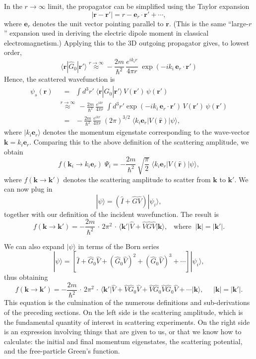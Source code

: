 \documentclass[pra,12pt]{revtex4}
\begin{document}
In the $r\rightarrow\infty$ limit, the propagator can be simplified
using the Taylor expansion
$$|\mathbf{r} - \mathbf{r}'| = r - \mathbf{e}_r \cdot \mathbf{r}' + \cdots,$$
where $\mathbf{e}_r$ denotes the unit vector pointing parallel to
$\mathbf{r}$.  (This is the same ``large-$r$'' expansion used in
deriving the electric dipole moment in classical electromagnetism.)
Applying this to the 3D outgoing propagator gives, to lowest order,
$$\langle\mathbf{r}|\hat{G}_0|\mathbf{r}'\rangle \overset{r\rightarrow\infty}{\approx} - \frac{2m}{\hbar^2}\, \frac{e^{ik_ir}}{4\pi r}\; \exp\left(-ik_i \,\mathbf{e}_r \cdot \mathbf{r}'\right)$$
Hence, the scattered wavefunction is
$$\begin{aligned}\psi_s(\mathbf{r}) &\;\;= \;\; \int d^3r'\; \langle\mathbf{r}|\hat{G}_0|\mathbf{r}'\rangle\, V(\mathbf{r}')\, \psi(\mathbf{r}') \\ &\overset{r\rightarrow\infty}{\approx} \, - \frac{2m}{\hbar^2} \, \frac{e^{ikr}}{4\pi r}\; \int d^3r' \exp\left(-ik_i \,\mathbf{e}_r \cdot \mathbf{r}'\right)\, V(\mathbf{r}')\, \psi(\mathbf{r}') \\ &\;\;=\;\; - \frac{2m}{\hbar^2} \, \frac{e^{ikr}}{4\pi r} \; (2\pi)^{3/2} \; \big\langle k_i \mathbf{e}_r \big|V(\hat{\mathbf{r}})\big|\psi\big\rangle, \end{aligned}$$
where $|k_i\mathbf{e}_r \rangle$ denotes the momentum eigenstate
corresponding to the wave-vector $\mathbf{k} = k_i\mathbf{e}_r$.
Comparing this to the above definition of the scattering amplitude, we
obtain
$$f(\mathbf{k}_i\rightarrow k_i\mathbf{e}_r )\; \Psi_i = - \frac{2m}{\hbar^2} \,\sqrt{\frac{\pi}{2}} \; \big\langle k_i \mathbf{e}_r \big|V(\hat{\mathbf{r}})\big|\psi\big\rangle,$$
where $f(\mathbf{k}\rightarrow \mathbf{k}')$ denotes the scattering
amplitude to scatter from $\mathbf{k}$ to $\mathbf{k}'$.  We can now
plug in
$$|\psi\rangle = \left(\hat{I} + \hat{G}\hat{V}\right)|\psi_i\rangle,$$
together with our definition of the incident wavefunction.  The result
is
$$f(\mathbf{k}\rightarrow \mathbf{k}') = - \frac{2m}{\hbar^2} \,\cdot \, 2\pi^2 \,\cdot\, \big\langle \mathbf{k}'\big| \hat{V} + \hat{V}\hat{G} \hat{V} \big|\mathbf{k}\big\rangle, \;\;\;\mathrm{where} \;\; |\mathbf{k}| = |\mathbf{k}'|.$$

We can also expand $|\psi\rangle$ in terms of the Born series
$$|\psi\rangle = \left[\hat{I} + \hat{G}_0 \hat{V} + (\hat{G}_0 \hat{V})^2 + (\hat{G}_0 \hat{V})^3 + \cdots\right]|\psi_i\rangle,$$
thus obtaining
$$\boxed{\;\;\;f(\mathbf{k}\rightarrow \mathbf{k}') = - \frac{2m}{\hbar^2} \,\cdot \, 2\pi^2 \,\cdot\, \big\langle \mathbf{k}'\big| \hat{V} + \hat{V}\hat{G}_0 \hat{V} + \hat{V} \hat{G}_0 \hat{V} \hat{G}_0\hat{V} + \cdots \big|\mathbf{k}\big\rangle, \;\;\; \;\; |\mathbf{k}| = |\mathbf{k}'|.\;\;\;}$$
This equation is the culmination of the numerous definitions and
sub-derivations of the preceding sections.  On the left side is the
scattering amplitude, which is the fundamental quantity of interest in
scattering experiments.  On the right side is an expression involving
things that are given to us, or that we know how to calculate: the
initial and final momentum eigenstates, the scattering potential, and
the free-particle Green's function.
\end{document}
